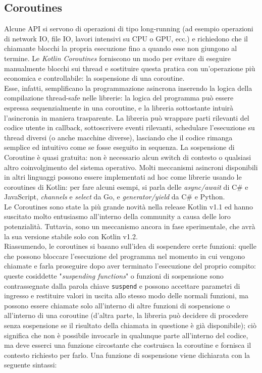 \subsection{Coroutines}
Alcune API si servono di operazioni di tipo long-running (ad esempio operazioni di network IO, file IO, lavori intensivi su CPU o GPU, ecc.) e richiedono che il chiamante blocchi la propria esecuzione fino a quando esse non giungono al termine. Le {\em Kotlin Coroutines} forniscono un modo per evitare di eseguire manualmente blocchi sui thread e sostituire questa pratica con un'operazione più economica e controllabile: la sospensione di una coroutine.\\
Esse, infatti, semplificano la programmazione asincrona inserendo la logica della compilazione thread-safe nelle librerie: la logica del programma può essere espressa sequenzialmente in una coroutine, e la libreria sottostante intuirà l'asincronia in maniera trasparente. La libreria può wrappare parti rilevanti del codice utente in callback, sottoscrivere eventi rilevanti, schedulare l'esecuzione su thread diversi (o anche macchine diverse), lasciando che il codice rimanga semplice ed intuitivo come se fosse eseguito in sequenza. La sospensione di Coroutine è quasi gratuita: non è necessario alcun switch di contesto o qualsiasi altro coinvolgimento del sistema operativo. Molti meccanismi asincroni disponibili in altri linguaggi possono essere implementati ad hoc come librerie usando le coroutines di Kotlin: per fare alcuni esempi, si parla delle {\em async/await} di C\# e JavaScript, {\em channels} e {\em select} da Go, e {\em generator/yield} da C\# e Python.\\
Le Coroutines sono state la più grande novità nella release Kotlin v1.1 ed hanno suscitato molto entusiasmo all'interno della community a causa delle loro potenzialità. Tuttavia, sono un meccanismo ancora in fase sperimentale, che avrà la sua versione stabile solo con Kotlin v1.2.\\
Riassumendo, le coroutines si basano sull'idea di sospendere certe funzioni: quelle che possono bloccare l'esecuzione del programma nel momento in cui vengono chiamate e farla proseguire dopo aver terminato l'esecuzione del proprio compito: queste cosiddette "{\em suspending functions}" o funzioni di sospensione sono contrassegnate dalla parola chiave \texttt{suspend} e possono accettare parametri di ingresso e restituire valori in uscita allo stesso modo delle normali funzioni, ma possono essere chiamate solo all'interno di altre funzioni di sospensione o all'interno di una coroutine (d'altra parte, la libreria può decidere di procedere senza sospensione se il risultato della chiamata in questione è già disponibile); ciò significa che non è possibile invocarle in qualunque parte all'interno del codice, ma deve esserci una funzione circostante che costruisca la coroutine e fornisca il contesto richiesto per farlo. Una funzione di sospensione viene dichiarata con la seguente sintassi:\\

